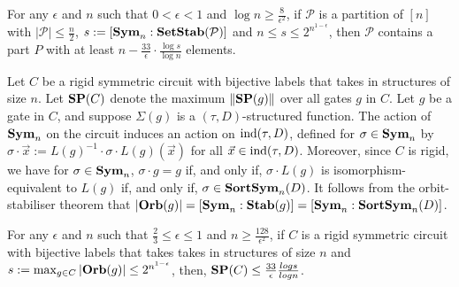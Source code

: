 \documentclass[../paper.tex]{subfiles}
\begin{document}
\begin{lem}
  \label{lem:small-means-support}
  For any $\epsilon$ and $n$ such that $0 < \epsilon < 1$ and $\log n \geq
  \frac{8}{\epsilon^2}$, if $\mathcal{P}$ is a partition of $[n]$ with $\vert
  \mathcal{P} \vert \leq \frac{n}{2}$, $s:= [\text{\textbf{Sym}}_n : \text{\textbf{SetStab}} (\mathcal{P})]$
  and $n \leq s \leq 2^{n^{1-\epsilon}}$, then $\mathcal{P}$ contains a part $P$
  with at least $n - \frac{33}{\epsilon} \cdot \frac{\log s} {\log n}$ elements.
\end{lem}

Let $C$ be a rigid symmetric circuit with bijective labels that takes in
structures of size $n$. Let $\text{\textbf{SP}}(C)$ denote the maximum $\| \text{\textbf{SP}}(g) \|$ over all
gates $g$ in $C$. Let $g$ be a gate in $C$, and suppose $\Sigma (g)$ is a
$(\tau, D)$-structured function. The action of $\text{\textbf{Sym}}_n$ on the circuit induces
an action on $\text{\upshape ind}(\tau,D)$, defined for $\sigma \in \text{\textbf{Sym}}_n$ by $\sigma \cdot
\vec{x} := L(g)^{-1} \cdot \sigma \cdot L(g) (\vec{x})$ for all $\vec{x} \in
\text{\upshape ind}(\tau,D)$. Moreover, since $C$ is rigid, we have for $\sigma \in \text{\textbf{Sym}}_n$,
$\sigma \cdot g = g$ if, and only if, $\sigma \cdot L(g)$ is
isomorphism-equivalent to $L(g)$ if, and only if, $\sigma \in \text{\textbf{SortSym}}_n(D)$. It
follows from the orbit-stabiliser theorem that $\vert \text{\textbf{Orb}} (g) \vert = [\text{\textbf{Sym}}_n :
\text{\textbf{Stab}}(g)] = [\text{\textbf{Sym}}_n : \text{\textbf{SortSym}}_n(D)]$.

\begin{thm}
  \label{thm:support_thm}
  For any $\epsilon$ and $n$ such that $\frac{2}{3} \leq \epsilon \leq 1$ and $n
  \geq \frac{128}{\epsilon^2}$, if $C$ is a rigid symmetric circuit with
  bijective labels that takes takes in structures of size $n$ and $s := \max_{g
    \in C} \vert \text{\textbf{Orb}} (g)\vert \leq 2^{n^{1-\epsilon}}$, then, $\text{\textbf{SP}}(C) \leq
  \frac{33}{\epsilon}\frac{log s}{log n}$.
\end{thm}
\end{document}
